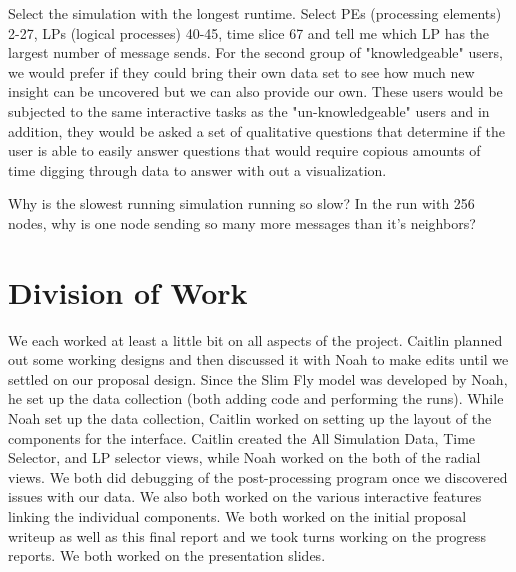 \documentclass{acm_proc_article-sp}
\begin{document}
Select the simulation with the longest runtime. Select PEs (processing elements) 2-27,  LPs (logical processes) 40-45, time slice 67 and tell me which LP has the largest number of message sends.
For the second group of "knowledgeable" users, we would prefer if they could bring their own data set to see how much new insight can be uncovered but we can also provide our own. These users would be subjected to the same interactive tasks as the "un-knowledgeable" users and in addition, they would be asked a set of qualitative questions that determine if the user is able to easily answer questions that would require copious amounts of time digging through data to answer with out a visualization.

Why is the slowest running simulation running so slow?
In the run with 256 nodes, why is one node sending so many more messages than it's neighbors?

\section{Division of Work}
We each worked at least a little bit on all aspects of the project.  Caitlin planned out some working designs and then discussed it with Noah to make edits until we settled on our proposal design.  Since the Slim Fly model was developed by Noah, he set up the data collection (both adding code and performing the runs).  While Noah set up the data collection, Caitlin worked on setting up the layout of the components for the interface.  Caitlin created the All Simulation Data, Time Selector, and LP selector views, while Noah worked on the both of the radial views.  We both did debugging of the post-processing program once we discovered issues with our data.  We also both worked on the various interactive features linking the individual components.  We both worked on the initial proposal writeup as well as this final report and we took turns working on the progress reports.  We both worked on the presentation slides.  





%

%
%


\end{document}
